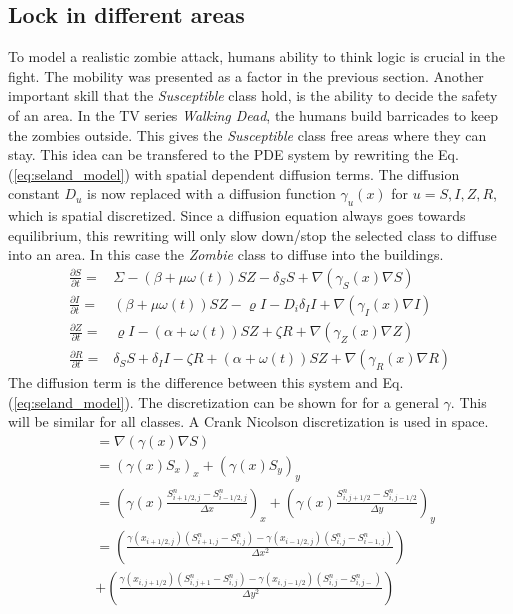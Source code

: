 \documentclass[%
twoside,                 %
final,                   %
10pt]{article}
\begin{document}
\noindent
\subsection{Lock in different areas}
To model a realistic zombie attack, humans ability to think logic is crucial in the fight. The mobility was presented as a factor in the previous section. Another important skill that the \emph{Susceptible} class hold, is the ability to decide the safety of an area. In the TV series \emph{Walking Dead}, the humans build barricades to keep the zombies outside. This gives the \emph{Susceptible} class free areas where they can stay. This idea can be transfered to the PDE system by rewriting the Eq.(\ref{eq:seland_model}) with spatial dependent diffusion terms. The diffusion constant $D_u$ is now replaced with a diffusion function $\gamma_u(x)$ for $u= S,I,Z,R$, which is spatial discretized. Since a diffusion equation always goes towards equilibrium, this rewriting will only slow down/stop the selected class to diffuse into an area. In this case the \emph{Zombie} class to diffuse into the buildings. 
\begin{equation} \label{eq:seland_model_diff}
    \begin{aligned} 
    \frac{\partial S}{\partial t} =& \Sigma -(\beta+\mu \omega(t))SZ - \delta_SS +\nabla(\gamma_S(x) \nabla S) \\
    \frac{\partial I}{\partial t} =& (\beta+\mu \omega(t))SZ - \varrho I - D_i\delta_II+\nabla(\gamma_I(x) \nabla I)\\
    \frac{\partial Z}{\partial t} =& \varrho I- (\alpha+\omega(t))SZ + \zeta R+\nabla(\gamma_Z(x) \nabla Z)\\
    \frac{\partial R}{\partial t} =& \delta_SS +\delta_II -\zeta R + (\alpha+\omega(t))SZ+\nabla(\gamma_R(x) \nabla R) 
    \end{aligned}
\end{equation}
The diffusion term is the difference between this system and Eq.(\ref{eq:seland_model}). The discretization can be shown for for a general $\gamma$. This will be similar for all classes. A Crank Nicolson discretization is used in space.
\begin{equation} \label{eq:gamma}
    \begin{aligned}
    &=\nabla(\gamma(x) \nabla S) \\
    &=(\gamma(x) S_x)_x+(\gamma(x) S_y)_y \\
    &= \left(\gamma(x) \frac{S^{n}_{i+1/2,j}-S^{n}_{i-1/2,j}}{\Delta x}\right)_x+\left(\gamma(x) \frac{S^{n}_{i,j+1/2}-S^{n}_{i,j-1/2}}{\Delta y}\right)_y \\
    &= \left(\frac{\gamma(x_{i+1/2,j})(S^{n}_{i+1,j}-S^{n}_{i,j})-\gamma(x_{i-1/2,j})(S^{n}_{i,j}-S^{n}_{i-1,j})}{\Delta x^2}\right) \\
    &+ \left(\frac{\gamma(x_{i,j+1/2})(S^{n}_{i,j+1}-S^{n}_{i,j})-\gamma(x_{i,j-1/2})(S^{n}_{i,j}-S^{n}_{i,j-})}{\Delta y^2}\right)
    \end{aligned}
\end{equation}
\end{document}

